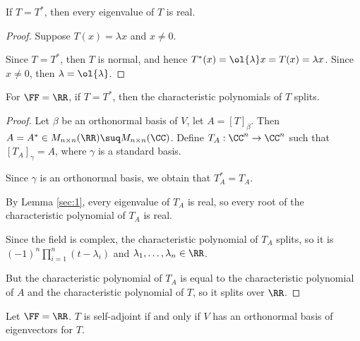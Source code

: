 \documentclass[11pt]{scrartcl}
\begin{document}
\begin{lemma}
  \label{sec:1}
If $T=T^{*}$, then every eigenvalue of $T$ is real.
\end{lemma}

\begin{proof}
  \hfill

  Suppose $T(x) = \lambda x$ and $x\neq 0$.

  Since $T = T^{*}$, then $T$ is normal, and hence $T^{*}(x) = \ol{\lambda} x = T(x) = \lambda x$. Since $x\neq 0$, then $\lambda  = \ol{\lambda}$.
\end{proof}

\begin{lemma}
  \label{sec:2}
For $\FF = \RR$, if $T = T^{*}$, then the characteristic polynomials of $T$ splits.
\end{lemma}

\begin{proof}
  \hfill

  Let $\beta$ be an orthonormal basis of $V$, let $A = [T]_{\beta}$. Then $A = A^{*} \in M_{n\times n}(\RR)\suq M_{n\times n}(\CC)$. Define $T_A: \CC^n\to \CC^n$ such that $[T_A]_{\gamma} = A$, where $\gamma$ is a standard basis.

Since $\gamma$ is an orthonormal basis, we obtain that $T_A^{*} = T_A$.

By Lemma \ref{sec:1}, every eigenvalue of $T_{A}$ is real, so every root of the characteristic polynomial of $T_A$ is real.

Since the field is complex, the characteristic polynomial of $T_A$ splits, so it is $(-1)^n\prod_{i=1}^n(t-\lambda_i)$ and $\lambda_1,\dots, \lambda_n\in\RR$.

But the characteristic polynomial of $T_A$ is equal to the characteristic polynomial of $A$ and the characteristic polynomial of $T$, so it splits over $\RR$.
\end{proof}

\begin{theorem}
Let $\FF = \RR$. $T$ is self-adjoint if and only if $V$ has an orthonormal basis of eigenvectors for $T$.
\end{theorem}
\end{document}
